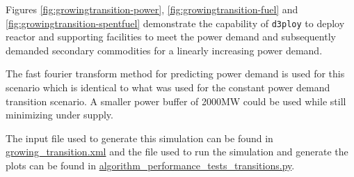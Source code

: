 \documentclass[11pt]{article}
\newcommand{\deploy}{\texttt{d3ploy}\xspace}%
\begin{document}
Figures \ref{fig:growingtransition-power}, \ref{fig:growingtransition-fuel}
and \ref{fig:growingtransition-spentfuel} demonstrate the capability 
of \deploy to deploy reactor and supporting facilities to meet the
power demand and subsequently demanded secondary commodities 
for a linearly increasing power demand. 

The fast fourier transform method for predicting power demand is used for 
this scenario
which is identical to what was used for the constant power demand 
transition scenario. 
A smaller power buffer of 2000MW could be used while still 
minimizing under supply. 

The input file used to generate this simulation can be found in
\href{https://github.com/arfc/d3ploy/blob/master/input/growning_transition.xml}{growing\_transition.xml} 
and the file used to run the simulation and generate the plots can be found in
\href{https://github.com/arfc/d3ploy/blob/master/tests/performance_tests/algorithm_performance_tests_transitions.py}{algorithm\_performance\_tests\_transitions.py}.
\end{document}
